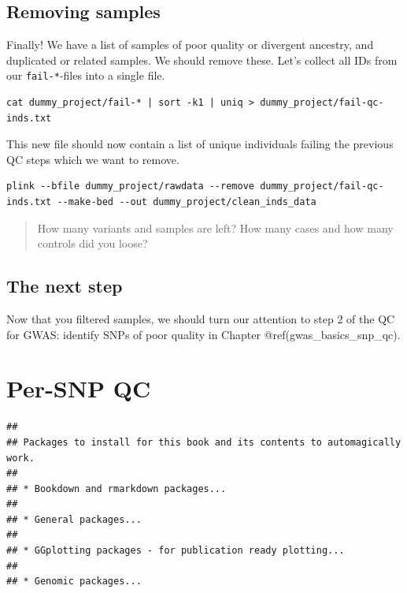 \documentclass[
]{book}
\newcommand{\passthrough}[1]{#1}
\begin{document}
\hypertarget{removing-samples}{%
\section{Removing samples}\label{removing-samples}}

Finally! We have a list of samples of poor quality or divergent ancestry, and duplicated or related samples. We should remove these. Let's collect all IDs from our \passthrough{\lstinline!fail-*!}-files into a single file.

\begin{lstlisting}
cat dummy_project/fail-* | sort -k1 | uniq > dummy_project/fail-qc-inds.txt
\end{lstlisting}

This new file should now contain a list of unique individuals failing the previous QC steps which we want to remove.

\begin{lstlisting}
plink --bfile dummy_project/rawdata --remove dummy_project/fail-qc-inds.txt --make-bed --out dummy_project/clean_inds_data
\end{lstlisting}

\begin{quote}
How many variants and samples are left? How many cases and how many controls did you loose?
\end{quote}

\hypertarget{the-next-step}{%
\section{The next step}\label{the-next-step}}

Now that you filtered samples, we should turn our attention to step 2 of the QC for GWAS: identify SNPs of poor quality in Chapter @ref(gwas\_basics\_snp\_qc).

\hypertarget{gwas_basics_snp_qc}{%
\chapter{Per-SNP QC}\label{gwas_basics_snp_qc}}

\begin{lstlisting}
## 
## Packages to install for this book and its contents to automagically work.
## 
## * Bookdown and rmarkdown packages...
## 
## * General packages...
## 
## * GGplotting packages - for publication ready plotting...
## 
## * Genomic packages...
\end{lstlisting}
\end{document}
